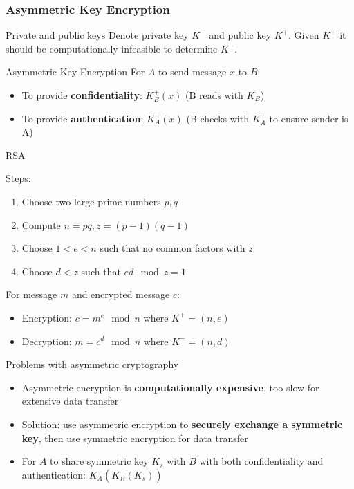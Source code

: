 
\subsubsection{Asymmetric Key Encryption}

\begin{knBox}
    {Private and public keys}
    Denote private key $K^-$ and public key $K^+$. Given $K^+$ it should be computationally infeasible to determine $K^-$.
\end{knBox}

\begin{definition}
    {Asymmetric Key Encryption}
    For $A$ to send message $x$ to $B$:
    \begin{itemize}
        \item To provide \textbf{confidentiality}: $K_B^+(x)$ (B reads with $K_B^-$)
        \item To provide \textbf{authentication}: $K_A^-(x)$ (B checks with $K_A^+$ to ensure sender is A)
    \end{itemize}
\end{definition}

\begin{definition}
    {RSA}

    Steps:
    \begin{enumerate}
        \item Choose two large prime numbers $p,q$
        \item Compute $n=pq, z=(p-1)(q-1)$
        \item Choose $1<e<n$ such that no common factors with $z$
        \item Choose $d < z$ such that $ed \mod z = 1$
    \end{enumerate}
    For message $m$ and encrypted message $c$:
    \begin{itemize}
        \item Encryption: $c = m^e \mod n$ where $K^+ = (n,e)$
        \item Decryption: $m = c^d \mod n$ where $K^- = (n,d)$
    \end{itemize}
\end{definition}

\begin{knBox}
    {Problems with asymmetric cryptography}
    \begin{itemize}
        \item Asymmetric encryption is \textbf{computationally expensive}, too slow for extensive data transfer
        \item Solution: use asymmetric encryption to \textbf{securely exchange a symmetric key}, then use symmetric encryption for data transfer
        \item For $A$ to share symmetric key $K_s$ with $B$ with both confidentiality and authentication: $K^-_A(K^+_B(K_s))$
    \end{itemize}
\end{knBox}

